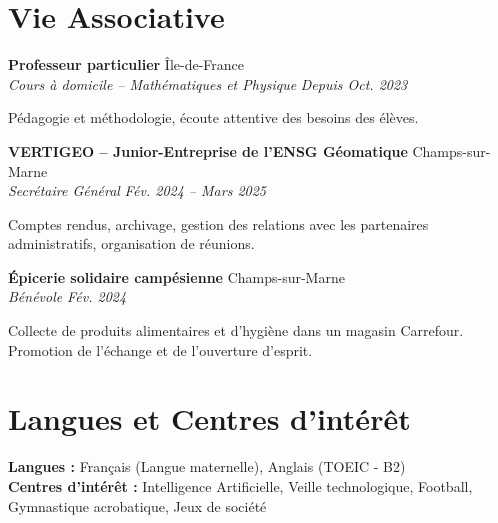 \documentclass[11pt, a4paper]{article}
\newcommand{\cventry}[4]{
    \vspace{0.1cm}
    \noindent \textbf{#1} \hfill #2 \\
    \noindent \textit{#3} \hfill \textit{#4} \par
    \vspace{0.05cm}
}
\begin{document}
\section*{Vie Associative}

\cventry{Professeur particulier}{Île-de-France}{Cours à domicile -- Mathématiques et Physique}{Depuis Oct. 2023}
\noindent Pédagogie et méthodologie, écoute attentive des besoins des élèves.

\cventry{VERTIGEO -- Junior-Entreprise de l'ENSG Géomatique}{Champs-sur-Marne}{Secrétaire Général}{Fév. 2024 -- Mars 2025}
\noindent Comptes rendus, archivage, gestion des relations avec les partenaires administratifs, organisation de réunions.

\cventry{Épicerie solidaire campésienne}{Champs-sur-Marne}{Bénévole}{Fév. 2024}
\noindent Collecte de produits alimentaires et d'hygiène dans un magasin Carrefour. Promotion de l'échange et de l'ouverture d'esprit.

\section*{Langues et Centres d'intérêt}
\noindent \textbf{Langues :} Français (Langue maternelle), Anglais (TOEIC - B2) \\[0.1cm]
\textbf{Centres d'intérêt :} Intelligence Artificielle, Veille technologique, Football, Gymnastique acrobatique, Jeux de société
\end{document}
